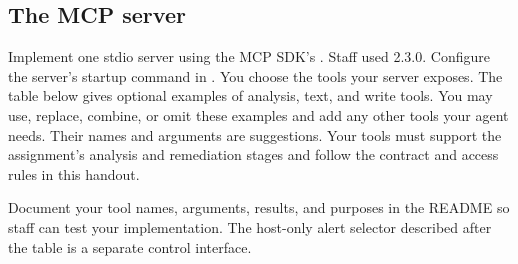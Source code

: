 \documentclass[9pt,letterpaper]{article}
\begin{document}
\subsection{The MCP server}\label{sec:server}

Implement one stdio server using the MCP SDK's . Staff used
 2.3.0. Configure the server's startup command in .
You choose the tools your server exposes. The table below gives optional examples
of analysis, text, and write tools. You may use, replace, combine, or omit these
examples and add any other tools your agent needs. Their names and arguments are
suggestions. Your tools must support the assignment's analysis and remediation
stages and follow the contract and access rules in this handout.

Document your tool names, arguments, results, and purposes in the README so staff
can test your implementation. The host-only alert selector described after the
table is a separate control interface.
\end{document}
